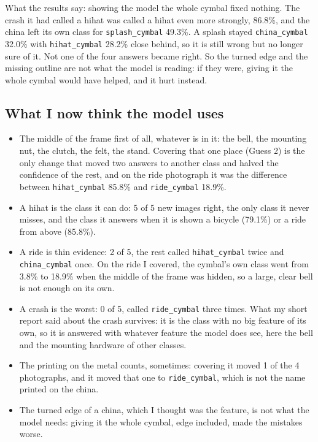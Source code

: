 \documentclass[11pt]{article}
\begin{document}
What the results say: showing the model the whole cymbal fixed nothing. The
crash it had called a hihat was called a hihat even more strongly, 86.8\%, and
the china left its own class for \texttt{splash\_cymbal} 49.3\%. A splash stayed
\texttt{china\_cymbal} 32.0\% with \texttt{hihat\_cymbal} 28.2\% close behind, so
it is still wrong but no longer sure of it. Not one of the four answers became
right. So the turned edge and the missing outline are not what the model is
reading: if they were, giving it the whole cymbal would have helped, and it hurt
instead.

\subsection*{What I now think the model uses}

\begin{itemize}
\item The middle of the frame first of all, whatever is in it: the bell, the
mounting nut, the clutch, the felt, the stand. Covering that one place (Guess 2)
is the only change that moved two answers to another class and halved the
confidence of the rest, and on the ride photograph it was the difference between
\texttt{hihat\_cymbal} 85.8\% and \texttt{ride\_cymbal} 18.9\%.
\item A hihat is the class it can do: 5 of 5 new images right, the only class it
never misses, and the class it answers when it is shown a bicycle (79.1\%) or a
ride from above (85.8\%).
\item A ride is thin evidence: 2 of 5, the rest called \texttt{hihat\_cymbal}
twice and \texttt{china\_cymbal} once. On the ride I covered, the cymbal's own
class went from 3.8\% to 18.9\% when the middle of the frame was hidden, so a
large, clear bell is not enough on its own.
\item A crash is the worst: 0 of 5, called \texttt{ride\_cymbal} three times.
What my short report said about the crash survives: it is the class with no big
feature of its own, so it is answered with whatever feature the model does see,
here the bell and the mounting hardware of other classes.
\item The printing on the metal counts, sometimes: covering it moved 1 of the 4
photographs, and it moved that one to \texttt{ride\_cymbal}, which is not the
name printed on the china.
\item The turned edge of a china, which I thought was the feature, is not what
the model needs: giving it the whole cymbal, edge included, made the mistakes
worse.
\end{itemize}
\end{document}
